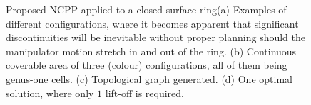 \documentclass[conference]{IEEEtran}
\begin{document}
\begin{figure}[t]
\centering
{}
\caption{Proposed NCPP applied to a closed surface ring(a) Examples of different configurations, where it becomes apparent that significant discontinuities will be inevitable without proper planning should the manipulator motion stretch in and out of the ring.  (b) Continuous coverable area 
of three (colour) configurations, all of them being genus-one cells. (c) Topological graph generated. (d) One optimal solution, where 
only $1$ lift-off is required.}
\label{fig_ring_exp}
\end{figure}



\end{document}
